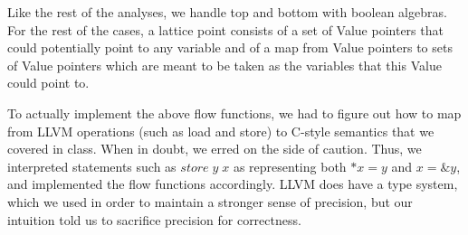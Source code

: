 \documentclass{article}
\theoremstyle{definition}
\begin{document}
Like the rest of the analyses, we handle top and bottom with boolean algebras. For the rest of the cases, a lattice point consists of a set of Value pointers that could potentially point to any variable and of a map from Value pointers to sets of Value pointers which are meant to be taken as the variables that this Value could point to. 

To actually implement the above flow functions, we had to figure out how to map from LLVM operations (such as load and store) to C-style semantics that we covered in class. When in doubt, we erred on the side of caution. Thus, we interpreted statements such as $store \; y \; x$ as representing both $*x = y$ and $x = \& y$, and implemented the flow functions accordingly. LLVM does have a type system, which we used in order to maintain a stronger sense of precision, but our intuition told us to sacrifice precision for correctness.
\end{document}
